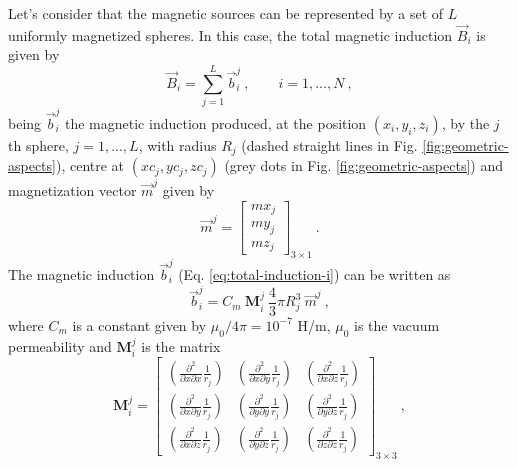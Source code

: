 \documentclass[journal abbreviation, npg]{copernicus}
\begin{document}
Let's consider that the magnetic sources can be represented by a set of $L$ uniformly magnetized spheres. In this case, the total magnetic induction $\vec{B}_i$ is given by
\begin{equation}
\vec{B}_i = \sum_{j = 1}^{L} \vec{b}_{i}^{j} \: , \qquad i = 1, ..., N \: ,
\label{eq:total-induction-i}
\end{equation}
being $\vec{b}^{j}_{i}$ the magnetic induction produced, at the position $(x_{i}, y_{i}, z_{i})$, by the $j$th sphere, $j = 1, ..., L$, with radius $R_ {j}$ (dashed straight lines in Fig. \ref{fig:geometric-aspects}), centre at $(xc_{j}, yc_{j}, zc_{j})$ (grey dots in Fig. \ref{fig:geometric-aspects}) and magnetization vector $\vec{m}^{j}$ given by
\begin{equation}
\vec{m}^{j} =
\left[
\begin{array}{c}
mx_{j} \\
my_{j} \\
mz_{j}
\end{array}
\right]_ {3 \times 1} \: .
\label{eq:mag-vector-j}
\end{equation}
The magnetic induction $\vec{b}^{j}_{i}$ (Eq. \ref{eq:total-induction-i}) can be written as
\begin{equation}
\vec{b}^{j}_{i} = C_{m} \: \mathbf{M}_{i}^{j} \: 
                  \dfrac{4}{3} \pi R_{j}^{3} \:
                  \vec{m}^{j} \: ,
\label{eq:j-induction-i}
\end{equation}
where $C_{m}$ is a constant given by $\mu_{0} / {4 \pi}=10^{-7}$ H/m, $\mu_{0}$ is the vacuum permeability and $\mathbf{M}_{i}^{j}$ is the matrix 
\begin{equation}
\mathbf{M}^{j}_{i} =
\left[
\begin{array}{ccc}
\left( \frac{\partial^{2}}{\partial x \partial x} \frac{1}{r_{j}} \right) &
\left( \frac{\partial^{2}}{\partial x \partial y} \frac{1}{r_{j}} \right) &
\left( \frac{\partial^{2}}{\partial x \partial z} \frac{1}{r_{j}} \right) \\
\left( \frac{\partial^{2}}{\partial x \partial y} \frac{1}{r_{j}} \right) &
\left( \frac{\partial^{2}}{\partial y \partial y} \frac{1}{r_{j}} \right) &
\left( \frac{\partial^{2}}{\partial y \partial z} \frac{1}{r_{j}} \right) \\
\left( \frac{\partial^{2}}{\partial x \partial z} \frac{1}{r_{j}} \right) &
\left( \frac{\partial^{2}}{\partial y \partial z} \frac{1}{r_{j}} \right) &
\left( \frac{\partial^{2}}{\partial z \partial z} \frac{1}{r_{j}} \right)
\end{array}
\right]_{3 \times 3} \: ,
\label{eq:matrix-Mij}
\end{equation}
\end{document}
